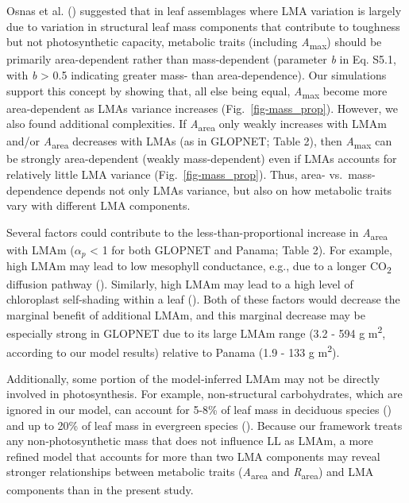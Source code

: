 \documentclass[
  12pt,
  letterpaper,
  DIV=11,
  numbers=noendperiod]{scrartcl}
\begin{document}
Osnas et al. () suggested that in leaf
assemblages where LMA variation is largely due to variation in
structural leaf mass components that contribute to toughness but not
photosynthetic capacity, metabolic traits (including
\emph{A}\textsubscript{max}) should be primarily area-dependent rather
than mass-dependent (parameter \emph{b} in Eq. S5.1, with \emph{b}
\textgreater{} 0.5 indicating greater mass- than area-dependence). Our
simulations support this concept by showing that, all else being equal,
\emph{A}\textsubscript{max} become more area-dependent as LMAs variance
increases (Fig.~\ref{fig-mass_prop}). However, we also found additional
complexities. If \emph{A}\textsubscript{area} only weakly increases with
LMAm and/or \emph{A}\textsubscript{area} decreases with LMAs (as in
GLOPNET; Table 2), then \emph{A}\textsubscript{max} can be strongly
area-dependent (weakly mass-dependent) even if LMAs accounts for
relatively little LMA variance (Fig.~\ref{fig-mass_prop}). Thus, area-
vs.~mass-dependence depends not only LMAs variance, but also on how
metabolic traits vary with different LMA components.

Several factors could contribute to the less-than-proportional increase
in \emph{A}\textsubscript{area} with LMAm (\(\alpha_p\) \textless{} 1
for both GLOPNET and Panama; Table 2). For example, high LMAm may lead
to low mesophyll conductance, e.g., due to a longer CO\textsubscript{2}
diffusion pathway ().
Similarly, high LMAm may lead to a high level of chloroplast
self-shading within a leaf (). Both of these factors would decrease the marginal benefit of
additional LMAm, and this marginal decrease may be especially strong in
GLOPNET due to its large LMAm range (3.2 - 594 g m\textsuperscript{2},
according to our model results) relative to Panama (1.9 - 133 g
m\textsuperscript{2}).

Additionally, some portion of the model‐inferred LMAm may not be
directly involved in photosynthesis. For example, non-structural
carbohydrates, which are ignored in our model, can account for 5-8\% of
leaf mass in deciduous species () and up to 20\% of leaf mass in evergreen species
().
Because our framework treats any non‐photosynthetic mass that does not
influence LL as LMAm, a more refined model that accounts for more than
two LMA components may reveal stronger relationships between metabolic
traits (\emph{A}\textsubscript{area} and \emph{R}\textsubscript{area})
and LMA components than in the present study.
\end{document}
